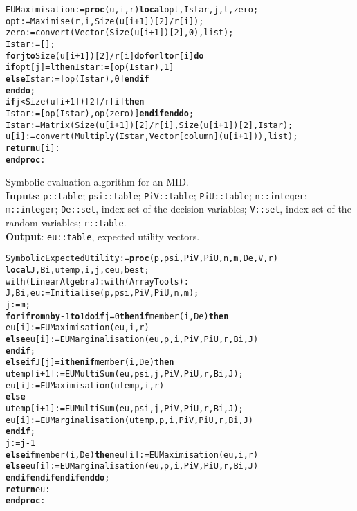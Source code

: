 \vspace{-0.4cm}
\begin{alltt}
EUMaximisation := \textbf{proc}(u, i, r) \textbf{local} opt, Istar, j, l, zero;
opt := Maximise(r, i, Size(u[i+1])[2]/r[i]);
zero := convert(Vector(Size(u[i+1])[2], 0), list);
Istar := [];
\textbf{for} j \textbf{to} Size(u[i+1])[2]/r[i] \textbf{do} \textbf{for} l \textbf{to} r[i] \textbf{do}
    \textbf{if} opt[j] = l \textbf{then}  Istar := [op(Istar), 1]  
    \textbf{else} Istar := [op(Istar), 0] \textbf{end if} 
 \textbf{end do}; 
  \textbf{if} j < Size(u[i+1])[2]/r[i] \textbf{then}
     Istar := [op(Istar), op(zero)] \textbf{end if} \textbf{end do};
Istar := Matrix(Size(u[i+1])[2]/r[i], Size(u[i+1])[2], Istar);
u[i] := convert(Multiply(Istar, Vector[column](u[i+1])), list); 
\textbf{return} u[i]:
\textbf{end proc}:
\end{alltt}


\noindent Symbolic evaluation algorithm for an MID. \\
\textbf{Inputs}: \verb|p::table|; \verb|psi::table|; \verb|PiV::table|; \verb|PiU::table|; \verb|n::integer|;\\
 \verb|m::integer|; \verb|De::set|, index set of the decision variables; \verb|V::set|, index set of the random variables; \verb|r::table|. \\
\textbf{Output}: \verb|eu::table|, expected utility vectors.

\vspace{-0.4cm}
\begin{alltt}
SymbolicExpectedUtility := \textbf{proc}(p, psi, PiV, PiU, n, m, De, V, r)
\textbf{local} J, Bi, utemp, i, j, ceu,best;
with(LinearAlgebra): with(ArrayTools):
J, Bi, eu := Initialise(p, psi, PiV, PiU, n, m);
j := m;
\textbf{for} i \textbf{from} n \textbf{by} -1 \textbf{to} 1 \textbf{do} \textbf{if} j = 0 \textbf{then} \textbf{if} member(i, De) \textbf{then}
      eu[i] := EUMaximisation(eu, i, r) 
    \textbf{else} eu[i] := EUMarginalisation(eu, p, i, PiV, PiU, r, Bi, J) 
    \textbf{end if}; 
  \textbf{else} \textbf{if} J[j] = i \textbf{then}  \textbf{if} member(i, De) \textbf{then} 
        utemp[i+1] := EUMultiSum(eu, psi, j, PiV, PiU, r, Bi, J); 
        eu[i] := EUMaximisation(utemp, i, r) 
      \textbf{else}
        utemp[i+1] := EUMultiSum(eu, psi, j, PiV, PiU, r, Bi, J); 
        eu[i] := EUMarginalisation(utemp, p, i, PiV, PiU, r, Bi, J)
      \textbf{end if};
      j := j-1
    \textbf{else} \textbf{if} member(i, De) \textbf{then} eu[i] := EUMaximisation(eu, i, r)
      \textbf{else} eu[i] := EUMarginalisation(eu, p, i, PiV, PiU, r, Bi, J)
\textbf{end if} \textbf{end if} \textbf{end if} \textbf{end do};
\textbf{return} eu: 
\textbf{end proc}:
\end{alltt}

